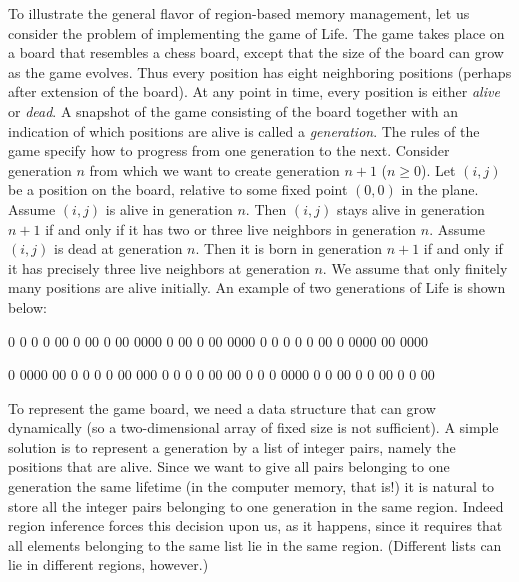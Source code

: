 \documentclass[12pt]{book}
\begin{document}
%
To illustrate the general flavor of region-based memory management, let us
consider the problem of implementing the game of Life. The game takes place on a
board that resembles a chess board, except that the size of the board can grow
as the game evolves. Thus every position has eight neighboring positions
(perhaps after extension of the board).  At any point in time, every position is
either {\em alive} or {\em dead}. A snapshot of the game consisting of the board
together with an indication of which positions are alive is called a {\em
  generation}. The rules of the game specify how to progress from one generation
to the next. Consider generation $n$ from which we want to create generation
$n+1$ ($n\geq0$). Let $(i,j)$ be a position on the board, relative to some fixed
point $(0,0)$ in the plane. Assume $(i,j)$ is alive in generation $n$. Then
$(i,j)$ stays alive in generation $n+1$ if and only if it has two or three live
neighbors in generation $n$. Assume $(i,j)$ is dead at generation $n$. Then it
is born in generation $n+1$ if and only if it has precisely three live neighbors
at generation $n$. We assume that only finitely many positions are alive
initially. An example of two generations of Life is shown below:
\begin{scriptcode}[xleftmargin=.1\textwidth]
                    0
                   0 0
                  0   00        0
       00         0   00     0000   0
       00         0   00    0000    0
                   0 0      0  0        00
                    0       0000        00
                             0000


                    0
                   0000
                  00 0 0      0 0
       00        000 0  0   0   0
       00         00 0 0    0
                   0000    0    0       00
                    0       0           00
                            0   0
                              00
\end{scriptcode}

To represent the game board, we need a data structure that can grow dynamically
(so a two-dimensional array of fixed size is not sufficient).  A simple solution
is to represent a generation by a list of integer pairs, namely the positions
that are alive. Since we want to give all pairs belonging to one generation the
same lifetime (in the computer memory, that is!)  it is natural to store all the
integer pairs belonging to one generation in the same region. Indeed region
inference forces this decision upon us, as it happens, since it requires that
all elements belonging to the same list lie in the same region. (Different lists
can lie in different regions, however.)
\end{document}
